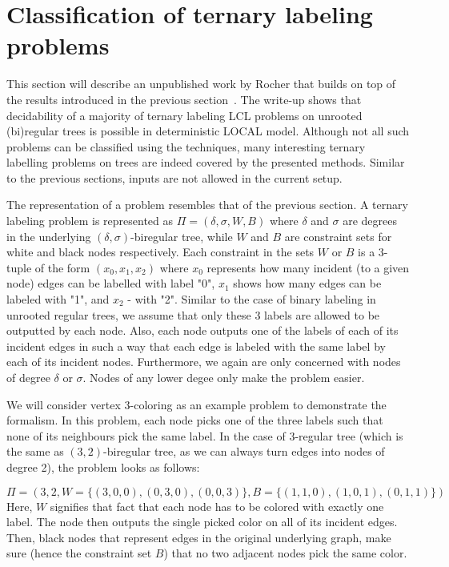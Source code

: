 \section{Classification of ternary labeling problems}

This section will describe an unpublished work by Rocher that builds on top
of the results introduced in the previous section~\cite{Rocher2020doc, Rocher2020clas}.
The write-up shows that decidability of a majority of ternary labeling LCL problems on unrooted
(bi)regular trees is possible in deterministic LOCAL model. Although not all such problems
can be classified using the techniques, many interesting ternary labelling problems on trees
are indeed covered by the presented methods.
Similar to the previous sections, inputs are not allowed in the current setup.

The representation of a problem resembles that of the previous section. A
ternary labeling problem is represented as $\Pi = (\delta, \sigma, W, B)$
where $\delta$ and $\sigma$ are degrees in the underlying $(\delta, \sigma)$-biregular
tree, while $W$ and $B$ are constraint sets for white and black nodes respectively.
Each constraint in the sets $W$ or $B$ is a 3-tuple of the form $(x_0, x_1, x_2)$
where $x_0$ represents how many incident (to a given node) edges can be labelled with label "0",
$x_1$ shows how many edges can be labeled with "1", and $x_2$ - with "2". Similar to the case
of binary labeling in unrooted regular trees, we assume that only these 3 labels are allowed to
be outputted by each node. Also, each node outputs one of the labels of each of its incident edges
in such a way that each edge is labeled with the same label by each of its incident nodes.
Furthermore, we again are only concerned with nodes of degree $\delta$ or $\sigma$. Nodes of
any lower degee only make the problem easier.

We will consider vertex 3-coloring as an example problem to demonstrate the formalism.
In this problem, each node picks one of the three labels such that none of its neighbours
pick the same label. In the case of 3-regular tree (which is the same as $(3, 2)$-biregular tree,
as we can always turn edges into nodes of degree 2), the problem looks as follows:

$$\Pi = (3, 2, W = \{ (3, 0, 0), (0, 3, 0), (0, 0, 3) \}, B = \{ (1, 1, 0), (1, 0, 1), (0, 1, 1) \})$$
Here, $W$ signifies that fact that each node has to be colored with exactly one label. The node then outputs
the single picked color on all of its incident edges. Then, black nodes that represent edges in the
original underlying graph, make sure (hence the constraint set $B$) that no two adjacent nodes
pick the same color.

